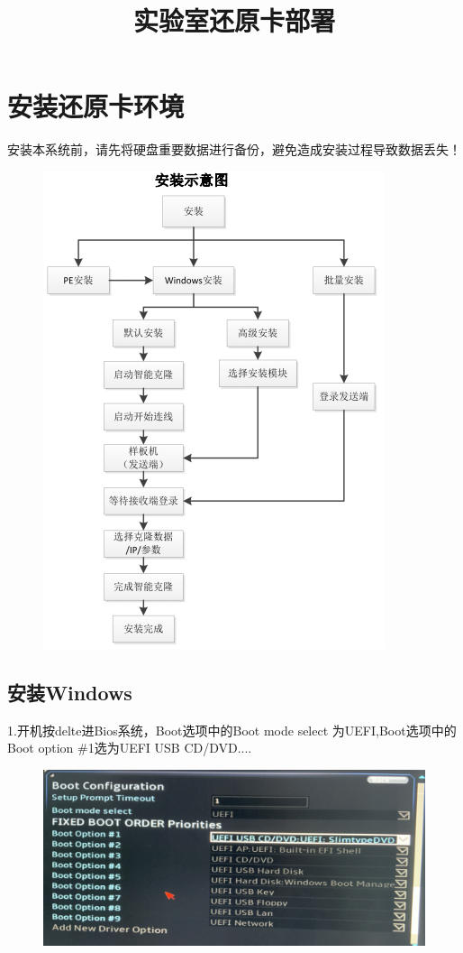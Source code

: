 \documentclass[openbib]{article}
\begin{document}
	
	\title{实验室还原卡部署}
	
	
	\maketitle
	
	\newpage
	\tableofcontents
	\newpage
\section{安装还原卡环境}
安装本系统前，请先将硬盘重要数据进行备份，避免造成安装过程导致数据丢失！
\begin{figure}[htbp]
	\centering
	\includegraphics[scale=0.4]{安装示意图}
\end{figure}
\subsection{安装Windows}
1.开机按delte进Bios系统，Boot选项中的Boot mode select 为UEFI,Boot选项中的Boot option \#1选为UEFI USB CD/DVD....
\begin{figure}[htbp]
	\centering
	\includegraphics[scale=0.3]{1}
\end{figure}
\end{document}
